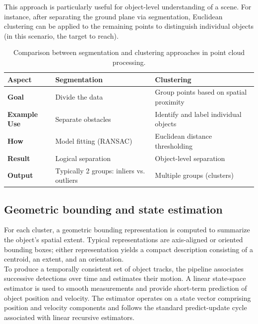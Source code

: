 \noindent This approach is particularly useful for object-level understanding of a scene. 
For instance, after separating the ground plane via segmentation, Euclidean clustering can be applied to the remaining points to distinguish individual objects (in this scenario, the target to reach).

\begin{table}[H]
\centering
\begin{tabular}{|l|l|l|}
\hline
\textbf{Aspect}   & \textbf{Segmentation} & \textbf{Clustering} \\ \hline
\textbf{Goal}     & Divide the data 
                  & Group points based on spatial proximity \\ \hline
\textbf{Example Use} & Separate obstacles 
                     & Identify and label individual objects \\ \hline
\textbf{How}      & Model fitting (RANSAC) 
                  & Euclidean distance thresholding \\ \hline
\textbf{Result}   & Logical separation 
                  & Object-level separation \\ \hline
\textbf{Output}   & Typically 2 groups: inliers vs. outliers 
                  & Multiple groups (clusters) \\ \hline
\end{tabular}
\caption{Comparison between segmentation and clustering approaches in point cloud processing.}
\end{table}

\subsection{Geometric bounding and state estimation}

For each cluster, a geometric bounding representation is computed to summarize the object's spatial extent. Typical representations are axis-aligned or oriented bounding boxes; 
either representation yields a compact description consisting of a centroid, an extent, and an orientation.
\\
To produce a temporally consistent set of object tracks, the pipeline associates successive detections over time and estimates their motion. 
A linear state-space estimator is used to smooth measurements and provide short-term prediction of object position and velocity. 
The estimator operates on a state vector comprising position and velocity components and follows the standard predict-update cycle associated with linear recursive estimators.


